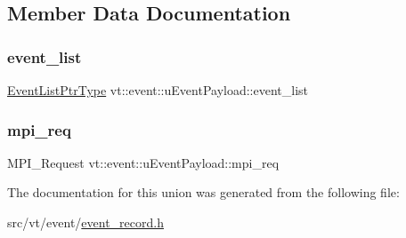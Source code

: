 \subsection{Member Data Documentation}
\mbox{\label{unionvt_1_1event_1_1u_event_payload_a1b6f1d27b5e4442788a9e9ca04446a14}} 
\subsubsection{\texorpdfstring{event\+\_\+list}{event\_list}}
{\footnotesize\ttfamily \hyperlink{namespacevt_1_1event_aa507caad8ea8ee959ccef2d57753dceb}{Event\+List\+Ptr\+Type} vt\+::event\+::u\+Event\+Payload\+::event\+\_\+list}

\mbox{\label{unionvt_1_1event_1_1u_event_payload_a36fd9f8a09add70a3379f3e646cc5b27}} 
\subsubsection{\texorpdfstring{mpi\+\_\+req}{mpi\_req}}
{\footnotesize\ttfamily M\+P\+I\+\_\+\+Request vt\+::event\+::u\+Event\+Payload\+::mpi\+\_\+req}



The documentation for this union was generated from the following file\+:\begin{DoxyCompactItemize}
\item 
src/vt/event/\hyperlink{event__record_8h}{event\+\_\+record.\+h}\end{DoxyCompactItemize}
